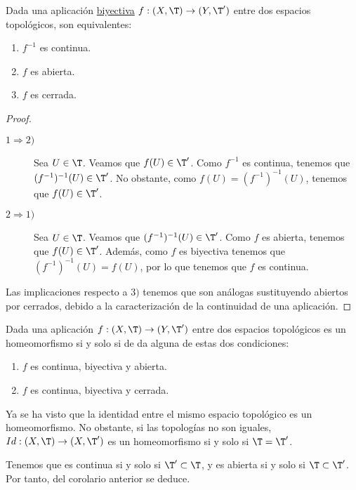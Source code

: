\begin{lema}
    Dada una aplicación \ul{biyectiva} $f:(X,\T)\to (Y,\T')$ entre dos espacios topológicos, son equivalentes:
    \begin{enumerate}
        \item $f^{-1}$ es continua.
        \item $f$ es abierta.
        \item $f$ es cerrada.
    \end{enumerate}
\end{lema}
\begin{proof}\
    \begin{description}
        \item[$1\Longrightarrow 2)$] Sea $U\in \T$. Veamos que $f(U)\in \T'$. Como $f^{-1}$ es continua, tenemos que $(f^{-1})^{-1}(U)\in \T'$. No obstante, como $f(U)=(f^{-1})^{-1}(U)$, tenemos que $f(U)\in \T'$.

        \item[$2\Longrightarrow 1)$] Sea $U\in \T$. Veamos que $(f^{-1})^{-1}(U)\in \T'$. Como $f$ es abierta, tenemos que $f(U)\in \T'$. Además, como $f$ es biyectiva tenemos que $(f^{-1})^{-1}(U)=f(U)$, por lo que tenemos que $f$ es continua.
    \end{description}

    Las implicaciones respecto a $3)$ tenemos que son análogas sustituyendo abiertos por cerrados, debido a la caracterización de la continuidad de una aplicación.
\end{proof}
\begin{coro}\label{coro:HomeomorfismoEquivContBiyAbierta}
    Dada una aplicación $f:(X,\T)\to (Y,\T')$ entre dos espacios topológicos es un homeomorfismo si y solo si de da alguna de estas dos condiciones:
    \begin{enumerate}
        \item $f$ es continua, biyectiva y abierta.
        \item $f$ es continua, biyectiva y cerrada.
    \end{enumerate}
\end{coro}

\begin{observacion}
    Ya se ha visto que la identidad entre el mismo espacio topológico es un homeomorfismo. No obstante, si las topologías no son iguales, $Id:(X,\T)\to (X,\T')$ es un homeomorfismo si y solo si $\T=\T'$.

    Tenemos que es continua si y solo si $\T'\subset \T$, y es abierta si y solo si $\T\subset \T'$. Por tanto, del corolario anterior se deduce.
\end{observacion}



